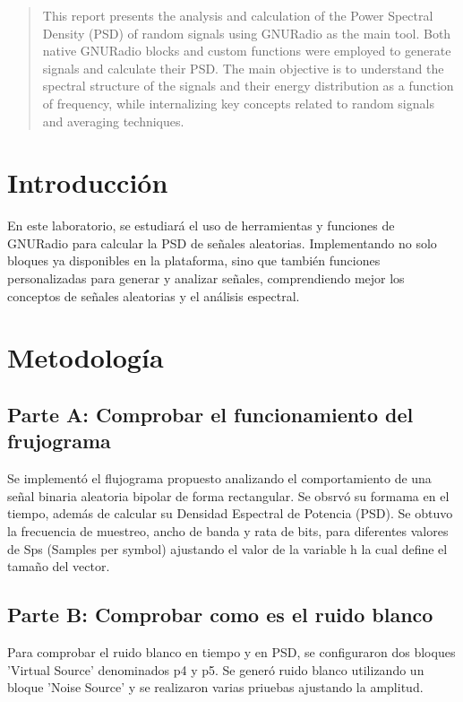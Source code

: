 \documentclass{journal}[IEEEtran, twocolumn]             %
\begin{document}
\begin{multicols}{2}

\begin{abstract}
    This report presents the analysis and calculation of the Power Spectral Density (PSD) of random signals using GNURadio as the main tool. Both native GNURadio blocks and custom functions were employed to generate signals and calculate their PSD. The main objective is to understand the spectral structure of the signals and their energy distribution as a function of frequency, while internalizing key concepts related to random signals and averaging techniques.
\end{abstract}

\section{Introducción}
   En este laboratorio, se estudiará el uso de herramientas y funciones de GNURadio para calcular la PSD de señales aleatorias. Implementando no solo bloques ya disponibles en la plataforma, sino que también funciones personalizadas para generar y analizar señales, comprendiendo mejor los conceptos de señales aleatorias y el análisis espectral.


\section{Metodología}
\subsection{Parte A: Comprobar el funcionamiento del frujograma}
Se implementó el flujograma propuesto analizando el comportamiento de una señal binaria aleatoria bipolar de forma rectangular. Se obsrvó su formama en el tiempo, además de calcular su Densidad Espectral de Potencia (PSD). Se obtuvo la frecuencia de muestreo, ancho de banda y rata de bits, para diferentes valores de Sps (Samples per symbol) ajustando el valor de la variable h la cual define el tamaño del vector.



\subsection{Parte B: Comprobar como es el ruido blanco}
Para comprobar el ruido blanco en tiempo y en PSD, se configuraron dos bloques 'Virtual Source'  denominados p4 y p5. Se generó ruido blanco utilizando un bloque 'Noise Source'  y se realizaron varias priuebas ajustando la amplitud. 


\end{multicols}
\end{document}
